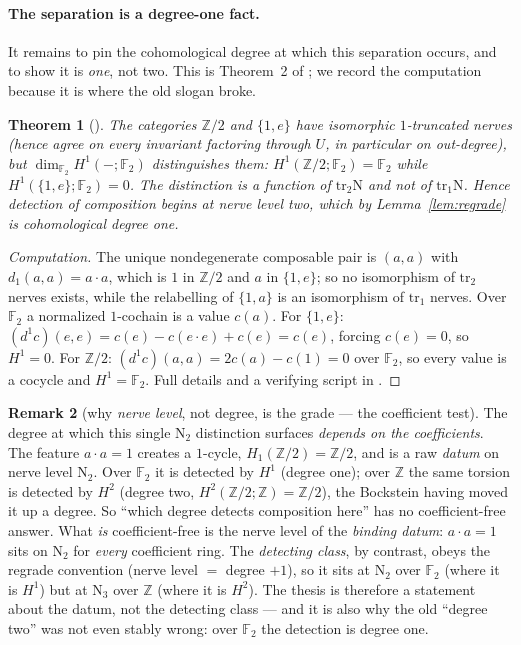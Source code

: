 \documentclass[11pt]{article}
\newtheorem{theorem}{Theorem}
\theoremstyle{definition}
\newtheorem{remark}[theorem]{Remark}
\newcommand{\tr}{\mathrm{tr}}
\newcommand{\Z}{\mathbb{Z}}
\newcommand{\F}{\mathbb{F}}
\newcommand{\Nerve}{\mathrm{N}}
\begin{document}
\paragraph{The separation is a degree-one fact.}
It remains to pin the cohomological degree at which this separation occurs, and to show it is
\emph{one}, not two. This is Theorem~2 of \cite{MacBethNerve}; we record the computation because it is
where the old slogan broke.

\begin{theorem}[\cite{MacBethNerve}]\label{thm:degreeone}
The categories $\Z/2$ and $\{1,e\}$ have isomorphic $1$-truncated nerves (hence agree on every
invariant factoring through $U$, in particular on out-degree), but
$\dim_{\F_2}H^1(-;\F_2)$ distinguishes them: $H^1(\Z/2;\F_2)=\F_2$ while $H^1(\{1,e\};\F_2)=0$. The
distinction is a function of $\tr_2\Nerve$ and not of $\tr_1\Nerve$. Hence detection of composition
begins at nerve level two, which by Lemma~\ref{lem:regrade} is cohomological degree \emph{one}.
\end{theorem}

\begin{proof}[Computation]
The unique nondegenerate composable pair is $(a,a)$ with $d_1(a,a)=a\cdot a$, which is $1$ in $\Z/2$
and $a$ in $\{1,e\}$; so no isomorphism of $\tr_2$ nerves exists, while the relabelling of
$\{1,a\}$ is an isomorphism of $\tr_1$ nerves. Over $\F_2$ a normalized $1$-cochain is a value $c(a)$.
For $\{1,e\}$: $(d^1 c)(e,e)=c(e)-c(e\cdot e)+c(e)=c(e)$, forcing $c(e)=0$, so $H^1=0$. For $\Z/2$:
$(d^1 c)(a,a)=2c(a)-c(1)=0$ over $\F_2$, so every value is a cocycle and $H^1=\F_2$. Full details and
a verifying script in \cite{MacBethNerve}.
\end{proof}

\begin{remark}[why \emph{nerve level}, not degree, is the grade --- the coefficient test]
\label{rem:coefftest}
The degree at which this single $\Nerve_2$ distinction surfaces \emph{depends on the coefficients}.
The feature $a\cdot a=1$ creates a $1$-cycle, $H_1(\Z/2)=\Z/2$, and is a raw \emph{datum} on nerve
level $\Nerve_2$. Over $\F_2$ it is detected by $H^1$ (degree one); over $\Z$ the same torsion is
detected by $H^2$ (degree two, $H^2(\Z/2;\Z)=\Z/2$), the Bockstein having moved it up a degree. So
``which degree detects composition here'' has no coefficient-free answer. What \emph{is}
coefficient-free is the nerve level of the \emph{binding datum}: $a\cdot a=1$ sits on $\Nerve_2$ for
\emph{every} coefficient ring. The \emph{detecting class}, by contrast, obeys the regrade convention
(nerve level $=$ degree $+1$), so it sits at $\Nerve_2$ over $\F_2$ (where it is $H^1$) but at
$\Nerve_3$ over $\Z$ (where it is $H^2$). The thesis is therefore a statement about the datum, not
the detecting class --- and it is also why the old ``degree two'' was not even stably wrong: over
$\F_2$ the detection is degree one.
\end{remark}
\end{document}
